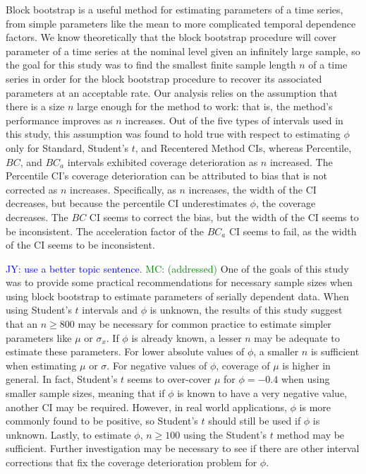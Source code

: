\documentclass[12pt, letterpaper, titlepage]{article}
\newcommand{\jy}[1]{\textcolor{blue}{JY: #1}}
\newcommand{\mc}[1]{\textcolor{green}{MC: (#1)}}
\begin{document}
Block bootstrap is a useful method for estimating parameters of a time series,
from simple parameters like the mean to more complicated temporal dependence
factors. We know theoretically that the block bootstrap procedure will cover
parameter of a time series at the nominal level given an infinitely large
sample, so the goal for this study was to find the smallest finite sample
length $n$ of a time series in order for the block bootstrap procedure to 
recover its associated parameters at an acceptable rate.
Our analysis relies on the assumption that there is a size $n$ large
enough for the method to work: that is, the method's performance improves as
$n$ increases. Out of the five types of intervals used in this study, this
assumption was found to hold true with respect to estimating $\phi$ only for
Standard, Student's $t$, and Recentered Method CIs, whereas Percentile, $BC$,
and $BC_a$ intervals exhibited coverage deterioration as $n$ increased. The
Percentile CI's coverage deterioration can be attributed to bias that is not
corrected as $n$ increases. Specifically, as $n$ increases, the width of the
CI decreases, but because the percentile CI underestimates $\phi$, the
coverage decreases. The $BC$ CI seems to correct the bias, but the width of
the CI seems to be inconsistent. The acceleration factor of the $BC_a$ CI
seems to fail, as the width of the CI seems to be inconsistent. 


\jy{use a better topic sentence.} \mc{addressed}
One of the goals of this study was to provide some practical recommendations for 
necessary sample sizes when using block bootstrap to estimate parameters of 
serially dependent data. When using Student's $t$ intervals and $\phi$ is unknown,
the results of this study suggest that an $n \geq 800$ may be necessary for common practice to
estimate simpler parameters like $\mu$ or $\sigma_x$. If $\phi$ is already
known, a lesser $n$ may be adequate to estimate these parameters. For lower
absolute values of $\phi$, a smaller $n$ is sufficient when estimating $\mu$
or $\sigma$. For negative values of $\phi$, coverage of $\mu$ is higher in
general. In fact, Student's $t$ seems to over-cover $\mu$ for $\phi = - 0.4$
when using smaller sample sizes, meaning that if $\phi$ is known to have a
very negative value, another CI may be required. However, in real world
applications, $\phi$ is more commonly found to be positive, so Student's $t$
should still be used if $\phi$ is unknown. Lastly, to estimate $\phi$,
$n \geq 100$ using the Student's $t$ method may be sufficient. Further
investigation may be necessary to see if there are other interval corrections
that fix the coverage deterioration problem for $\phi$.
\end{document}
